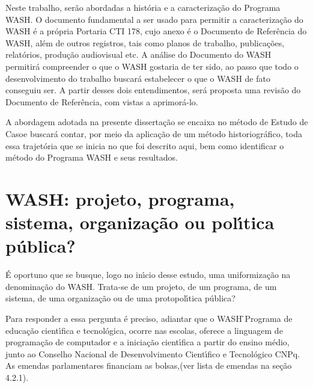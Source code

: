 \documentclass[
12pt,		%
openright,	%
twoside,  %
a4paper,			%
chapter=TITLE,		%
english,			%
french,				%
spanish,			%
brazil				%
]{USPSC-classe/USPSC}
\begin{document}
Neste trabalho, ser\~ao abordadas a hist\'oria e a caracteriza\c{c}\~ao do Programa WASH. O documento fundamental a ser usado para permitir a caracteriza\c{c}\~ao do WASH \'e a pr\'opria Portaria CTI 178, cujo anexo \'e o Documento de Refer\^encia do WASH, al\'em de outros registros, tais como planos de trabalho, publica\c{c}\~oes, relat\'orios,  produ\c{c}\~ao audiovisual etc.  A an\'alise do Documento do WASH permitir\'a compreender \textquotedbl o que o WASH gostaria de ter sido\textquotedbl , ao passo que todo o desenvolvimento do trabalho buscar\'a estabelecer \textquotedbl o que o WASH de fato conseguiu ser\textquotedbl . A partir desses dois entendimentos, ser\'a proposta uma revis\~ao do Documento de Refer\^encia, com vistas a aprimor\'a-lo.









A abordagem adotada na presente disserta\c{c}\~ao se encaixa no m\'etodo de \textquotedbl Estudo de Caso\textquotedbl   e buscar\'a contar, por meio da aplica\c{c}\~ao de um m\'etodo historiogr\'afico, toda essa trajet\'oria que se inicia no que foi descrito aqui, bem como identificar o m\'etodo do Programa WASH e seus resultados.









\section[WASH: projeto, programa, sistema, organiza\c{c}\~ao ou pol\'{\i}tica p\'ublica?]{WASH: projeto, programa, sistema, organiza\c{c}\~ao ou pol\'{\i}tica p\'ublica?}\label{WASH: projeto, programa, sistema, organiza\c{c}\~ao ou pol\'{\i}tica p\'ublica?}
\'E oportuno que se busque, logo no in\'{\i}cio desse estudo, uma uniformiza\c{c}\~ao na denomina\c{c}\~ao do WASH. Trata-se de um projeto, de um programa, de um sistema, de uma organiza\c{c}\~ao ou de uma protopol\'{\i}tica p\'ublica?









Para responder a essa pergunta \'e preciso, adiantar que o WASH \r\ncomo Programa de educa\c{c}\~ao cient\'{\i}fica e tecnol\'ogica, ocorre nas escolas, oferece a linguagem de programa\c{c}\~ao de computador e a inicia\c{c}\~ao cient\'{\i}fica a partir do  ensino m\'edio, junto ao Conselho Nacional de Desenvolvimento Cient\'{\i}fico e Tecnol\'ogico CNPq. As emendas parlamentares financiam as bolsas,(ver  lista de emendas na se\c{c}\~ao 4.2.1).
\end{document}
